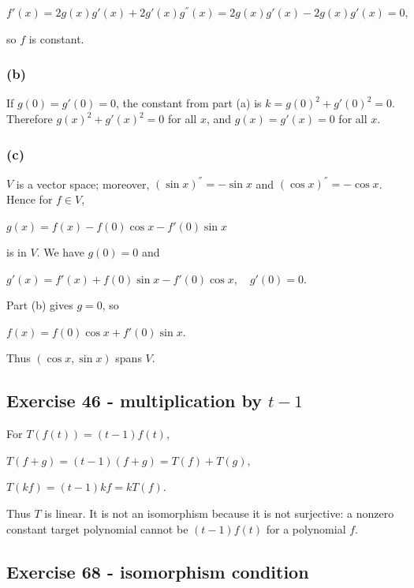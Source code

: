 \(f'(x) = 2g(x)g'(x) + 2g'(x)g^{''}(x) = 2g(x)g'(x) - 2g(x)g'(x) = 0,\)

so \(f\) is constant.

\subsubsection{(b)}

If \(g(0) = g'(0) = 0\), the constant from part (a) is \(k = {g(0)}^{2} + g'(0)^{2} = 0\). Therefore \({g(x)}^{2} + g'(x)^{2} = 0\) for all \(x\), and \(g(x) = g'(x) = 0\) for all \(x\).

\subsubsection{(c)}

\(V\) is a vector space; moreover, \(\left( {\sin x} \right)^{''} = - \sin x\) and \(\left( {\cos x} \right)^{''} = - \cos x\). Hence for \(f \in V\),

\(g(x) = f(x) - f(0)\cos x - f'(0)\sin x\)

is in \(V\). We have \(g(0) = 0\) and

\(g'(x) = f'(x) + f(0)\sin x - f'(0)\cos x,\quad g'(0) = 0.\)

Part (b) gives \(g = 0\), so

\(f(x) = f(0)\cos x + f'(0)\sin x.\)

Thus \(\left( {\cos x,\sin x} \right)\) spans \(V\).

\subsection{\texorpdfstring{Exercise 46 - multiplication by \(t - 1\)}{Exercise 46 - multiplication by t - 1}}

For \(T\left( {f(t)} \right) = \left( {t - 1} \right)f(t)\),

\(T\left( {f + g} \right) = \left( {t - 1} \right)\left( {f + g} \right) = T(f) + T(g),\)

\(T\left( {kf} \right) = \left( {t - 1} \right)kf = kT(f).\)

Thus \(T\) is linear. It is not an isomorphism because it is not surjective: a nonzero constant target polynomial cannot be \(\left( {t - 1} \right)f(t)\) for a polynomial \(f\).

\subsection{Exercise 68 - isomorphism condition}

